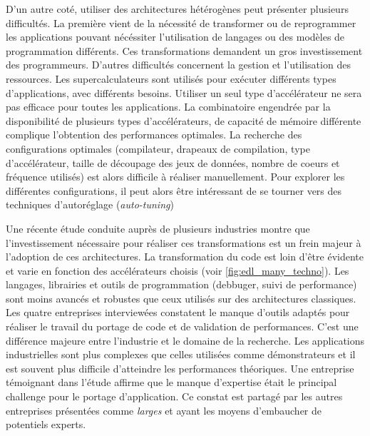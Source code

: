         D'un autre coté, utiliser des architectures hétérogènes peut présenter plusieurs difficultés. La première vient de la nécessité de transformer ou de reprogrammer les applications pouvant nécéssiter l'utilisation de langages  ou des modèles de programmation différents. Ces transformations demandent un gros investissement des programmeurs. D'autres difficultés concernent la gestion et l'utilisation des ressources. Les supercalculateurs sont utilisés pour exécuter différents types d'applications, avec différents besoins. Utiliser un seul type d'accélérateur ne sera pas efficace pour toutes les applications. La combinatoire engendrée par la disponibilité de plusieurs types d'accélérateurs, de capacité de mémoire différente complique l'obtention des performances optimales. La recherche des configurations optimales (compilateur, drapeaux de compilation, type d'accélérateur, taille de découpage des jeux de données, nombre de coeurs et fréquence utilisés) est alors difficile à réaliser manuellement. Pour explorer les différentes configurations, il peut alors être intéressant de se tourner vers des techniques d'autoréglage (\textit{auto-tuning}) \cite{datta2008stencil, hoste2008cole, mazouz2011performance, castro2015cere, popov:tel-01412638,  benkner_et_al:DR:2014:4423} 
        
        Une récente étude \cite{inproceedingsSCHC} conduite auprès de plusieurs industries montre que l'investissement nécessaire pour réaliser ces transformations est un frein majeur à l'adoption de ces architectures. La transformation du code est loin d'être évidente et varie en fonction des accélérateurs choisis (voir \autoref{fig:edl_many_techno}). Les langages, librairies et outils de programmation (debbuger, suivi de performance) sont moins avancés et robustes que ceux utilisés sur des architectures classiques. Les quatre entreprises interviewées \cite{inproceedingsSCHC} constatent le manque d'outils adaptés pour réaliser le travail du portage de code et de validation de performances. C'est une différence majeure entre l'industrie et le domaine de la recherche. Les applications industrielles sont plus complexes que celles utilisées comme démonstrateurs et il est souvent plus difficile d'atteindre les performances théoriques. Une entreprise témoignant dans l'étude \cite{inproceedingsSCHC} affirme que le manque d'expertise était le principal challenge pour le portage d'application. Ce constat est partagé par les autres entreprises présentées comme \textit{larges} et ayant les moyens d'embaucher de potentiels experts.
        
